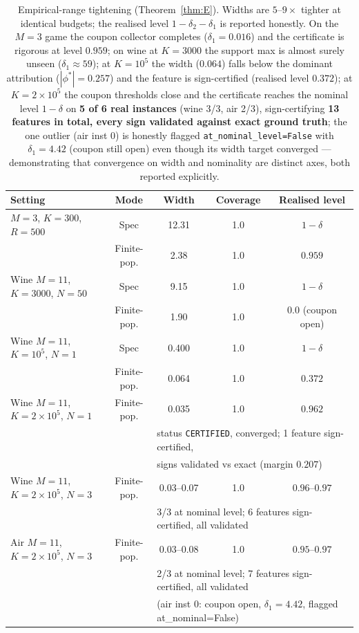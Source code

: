 \documentclass[11pt,twocolumn]{article}
\begin{document}
\begin{table}[t]\centering\small
\begin{tabular}{lcccc}
\toprule
Setting & Mode & Width & Coverage & Realised level \\
\midrule
$M{=}3$, $K{=}300$, $R{=}500$ & Spec & 12.31 & 1.0 & $1-\delta$ \\
& Finite-pop. & 2.38 & 1.0 & $0.959$ \\
\addlinespace
Wine $M{=}11$, $K{=}3000$, $N{=}50$ & Spec & 9.15 & 1.0 & $1-\delta$ \\
& Finite-pop. & 1.90 & 1.0 & $0.0$ (coupon open) \\
\addlinespace
Wine $M{=}11$, $K{=}10^5$, $N{=}1$ & Spec & 0.400 & 1.0 & $1-\delta$ \\
& Finite-pop. & 0.064 & 1.0 & $0.372$ \\
\addlinespace
Wine $M{=}11$, $K{=}2\times10^5$, $N{=}1$ & Finite-pop. & 0.035 & 1.0 & $0.962$ \\
& & \multicolumn{3}{l}{status \texttt{CERTIFIED}, converged; 1 feature sign-certified,} \\
& & \multicolumn{3}{l}{signs validated vs exact (margin $0.207$)} \\
\addlinespace
Wine $M{=}11$, $K{=}2\times10^5$, $N{=}3$ & Finite-pop. & 0.03--0.07 & 1.0 & $0.96$--$0.97$ \\
& & \multicolumn{3}{l}{3/3 at nominal level; 6 features sign-certified, all validated} \\
Air $M{=}11$, $K{=}2\times10^5$, $N{=}3$ & Finite-pop. & 0.03--0.08 & 1.0 & $0.95$--$0.97$ \\
& & \multicolumn{3}{l}{2/3 at nominal level; 7 features sign-certified, all validated} \\
& & \multicolumn{3}{l}{(air inst 0: coupon open, $\delta_1{=}4.42$, flagged at\_nominal=False)} \\
\bottomrule
\end{tabular}
\caption{Empirical-range tightening (Theorem~\ref{thm:E}).  Widths are
$5$--$9\times$ tighter at identical budgets; the realised level
$1-\delta_2-\delta_1$ is reported honestly.  On the $M{=}3$ game the
coupon collector completes ($\delta_1{=}0.016$) and the certificate is
rigorous at level $0.959$; on wine at $K{=}3000$ the support max is almost
surely unseen ($\delta_1{\approx}59$); at $K{=}10^5$ the width ($0.064$)
falls below the dominant attribution ($|\phi^*|=0.257$) and the feature is
sign-certified (realised level $0.372$); at $K{=}2\times10^5$ the coupon
thresholds close and the certificate reaches the nominal level $1-\delta$
on \textbf{5 of 6 real instances} (wine 3/3, air 2/3), sign-certifying
\textbf{13 features in total, every sign validated against exact ground
truth}; the one outlier (air inst 0) is honestly flagged
\texttt{at\_nominal\_level=False} with $\delta_1{=}4.42$ (coupon still
open) even though its width target converged — demonstrating that
convergence on width and nominality are distinct axes, both reported
explicitly.}
\label{tab:fp}
\end{table}
\end{document}
